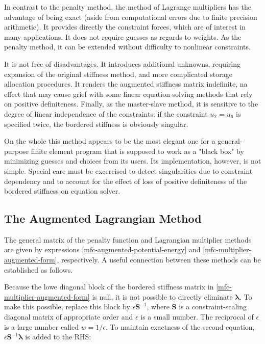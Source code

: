 \documentclass[10pt,b5paper,titlepage]{book}
\newcommand{\m}{\mathbf}
\newcommand{\M}{\pmb}
\begin{document}
In contrast to the penalty method, the method of Lagrange multipliers has the
advantage of being exact (aside from computational errors due to finite
precision arithmetic). It provides directly the constraint forces, which are of
interest in many applications. It does not require guesses as regards to weights.
As the penalty method, it can be extended without difficulty to nonlinear constraints.

It is not free of disadvantages. It introduces additional unknowns, requiring
expansion of the original stiffness method, and more complicated storage allocation
procedures. It renders the augmented stiffness matrix indefinite, na effect that
may cause grief with some linear equation solving methods that rely on positive
definiteness. Finally, as the master-slave method, it is sensitive to the degree
of linear independence of the constraints: if the constraint $ u_2 = u_6 $ is
specified twice, the bordered stiffness is obviously singular.

On the whole this method appears to be the most elegant one for a general-purpose
finite element program that is supposed to work as a "black box" by minimizing
guesses and choices from its users. Its implementation, however, is not simple.
Special care must be excercised to detect singularities due to constraint
dependency and to account for the effect of loss of positive definiteness of the
bordered stiffness on equation solver.


\subsection{The Augmented Lagrangian Method}

The general matrix of the penalty function and Lagrangian multiplier methods are
given by expressions \eqref{mfc-augmented-potential-energy} and
\eqref{mfc-multiplier-augmented-form}, respectively. A useful connection
between these methods can be established as follows.

Because the lowe diagonal block of the bordered stiffness matrix in
\eqref{mfc-multiplier-augmented-form} is null, it is not possible to directly
eliminate $ \M{\lambda} $. To make this possible, replace this block by
$ \epsilon \m{S}^{-1} $, where $ \m{S} $ is a constraint-scaling diagonal matrix
of appropriate order and $ \epsilon $ is a small number. The reciprocal of
$ \epsilon $ is a large number called $ w = 1 / \epsilon $. To maintain
exactness of the second equation, $ \epsilon \m{S}^{-1} \M{\lambda} $ is added
to the RHS:
\end{document}
